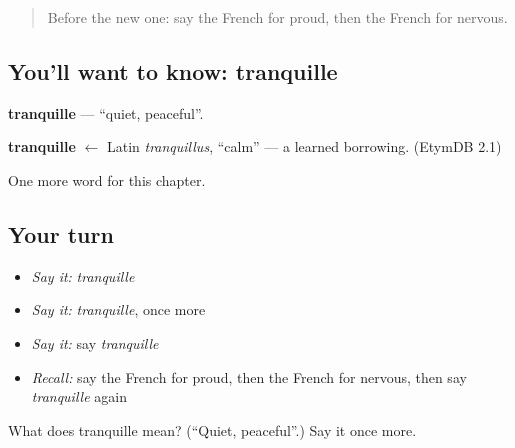 \label{lesson:FR-C218-tranquille}



\begin{quote}
Before the new one: say the French for proud, then the French for nervous.
\end{quote}

\subsection*{You'll want to know: tranquille}
\textbf{tranquille} — \textquotedblleft{}quiet, peaceful\textquotedblright{}.

\begin{cousinweb}
\textbf{tranquille} $\leftarrow$ Latin \emph{tranquillus}, \textquotedblleft{}calm\textquotedblright{} — a learned borrowing. (EtymDB 2.1)
\end{cousinweb}

\begin{grammarlens}[title={What you've built}]
One more word for this chapter.
\end{grammarlens}

\subsection*{Your turn}
\begin{itemize}
\raggedright
  \item \emph{Say it:} \emph{tranquille}
  \item \emph{Say it:} \emph{tranquille}, once more
  \item \emph{Say it:} say \emph{tranquille}
  \item \emph{Recall:} say the French for proud, then the French for nervous, then say \emph{tranquille} again
\end{itemize}

\begin{tcolorbox}[breakable,colback=teal!4,colframe=teal!35!black,title={Before you move on}]
What does tranquille mean? (\textquotedblleft{}Quiet, peaceful\textquotedblright{}.) Say it once more.
\end{tcolorbox}
